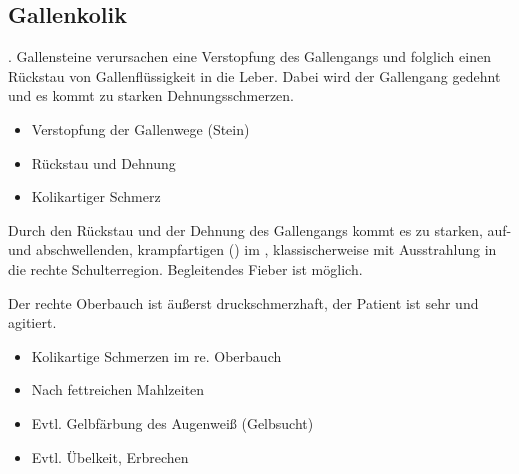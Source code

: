\subsection{Gallenkolik}
\label{topic:gallenkolik}%
%
%





{%
 . Gallensteine
verursachen eine Verstopfung des Gallengangs und 
folglich einen Rückstau von
Gallenflüssigkeit in die Leber. Dabei wird der Gallengang
gedehnt und es kommt zu starken Dehnungsschmerzen.} 
{
\begin{itemize}
  \item Verstopfung der Gallenwege (Stein)
  \item Rückstau und Dehnung
  \item Kolikartiger Schmerz
\end{itemize}
}{}{}{}


{%
Durch den Rückstau und der Dehnung des Gallengangs kommt es
zu starken, auf- und abschwellenden, krampfartigen
()  im , klassischerweise mit Ausstrahlung in die rechte
Schulterregion. Begleitendes Fieber ist möglich.

Der rechte Oberbauch ist äußerst druckschmerzhaft, der
Patient ist sehr  und agitiert.

}{
\begin{itemize}
  \item Kolikartige Schmerzen im re. Oberbauch
  \item Nach fettreichen Mahlzeiten
  \item Evtl. Gelbfärbung des Augenweiß (Gelbsucht)
  \item Evtl. Übelkeit, Erbrechen
\end{itemize}
}{}{}{}

% 
% 



